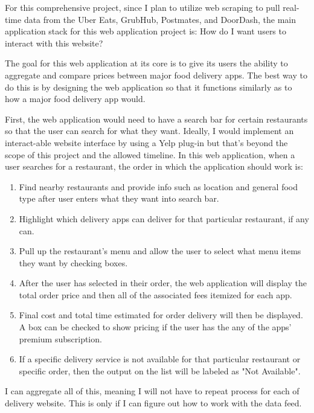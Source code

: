 \documentclass[10pt,twocolumn]{article}
\begin{document}
For this comprehensive project, since I plan to utilize web scraping to pull real-time data from the Uber Eats, GrubHub, Postmates, and DoorDash, the main application stack for this web application project is: How do I want users to interact with this website? 

The goal for this web application at its core is to give its users the ability to aggregate and compare prices between major food delivery apps. The best way to do this is by designing the web application so that it functions similarly as to how a major food delivery app would. 

First, the web application would need to have a search bar for certain restaurants so that the user can search for what they want. Ideally, I would implement an interact-able website interface by using a Yelp plug-in but that's beyond the scope of this project and the allowed timeline. In this web application, when a user searches for a restaurant, the order in which the application should work is:

\begin{enumerate}[label=(\Alph*)]
\item Find nearby restaurants and provide info such as location and general food type after user enters what they want into search bar.
\item Highlight which delivery apps can deliver for that particular restaurant, if any can.
\item Pull up the restaurant's menu and allow the user to select what menu items they want by checking boxes.
\item After the user has selected in their order, the web application will display the total order price and then all of the associated fees itemized for each app.
\item Final cost and total time estimated for order delivery will then be displayed. A box can be checked to show pricing if the user has the any of the apps' premium subscription.
\item If a specific delivery service is not available for that particular restaurant or specific order, then the output on the list will be labeled as "Not Available".
\end{enumerate}

I can aggregate all of this, meaning I will not have to repeat process for each of delivery website. This is only if I can figure out how to work with the data feed. 
\end{document}
